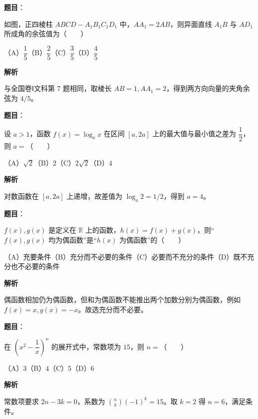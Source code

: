 \begin{answer}

\textbf{题目}：

如图，正四棱柱 $ABCD-A_1B_1C_1D_1$ 中，$AA_1=2AB$，则异面直线 $A_1B$ 与 $AD_1$ 所成角的余弦值为\mbox{（　　）}
\nopagebreak[4]
\begin{center}\end{center}
\nopagebreak[4]
（A）$\dfrac15$\quad（B）$\dfrac25$\quad（C）$\dfrac35$\quad（D）$\dfrac45$

\textbf{解析}

与全国卷Ⅰ文科第 7 题相同，取棱长 $AB=1,AA_1=2$，得到两方向向量的夹角余弦为 $4/5$。


\end{answer}
\begin{answer}

\textbf{题目}：

设 $a>1$，函数 $f(x)=\log_a x$ 在区间 $[a,2a]$ 上的最大值与最小值之差为 $\dfrac12$，则 $a=$\mbox{（　　）}

（A）$\sqrt2$\quad（B）$2$\quad（C）$2\sqrt2$\quad（D）$4$

\textbf{解析}

对数函数在 $[a,2a]$ 上递增，故差值为 $\log_a2=1/2$，得到 $a=4$。


\end{answer}
\begin{answer}

\textbf{题目}：

$f(x),g(x)$ 是定义在 $\mathbb R$ 上的函数，$h(x)=f(x)+g(x)$，则“$f(x),g(x)$ 均为偶函数”是“$h(x)$ 为偶函数”的\mbox{（　　）}

（A）充要条件\quad（B）充分而不必要的条件\quad（C）必要而不充分的条件\quad（D）既不充分也不必要的条件

\textbf{解析}

偶函数相加仍为偶函数，但和为偶函数不能推出两个加数分别为偶函数，例如 $f(x)=x,g(x)=-x$。故选充分而不必要。


\end{answer}
\begin{answer}

\textbf{题目}：

在 $\left(x^2-\dfrac1x\right)^n$ 的展开式中，常数项为 $15$，则 $n=$\mbox{（　　）}

（A）$3$\quad（B）$4$\quad（C）$5$\quad（D）$6$

\textbf{解析}

常数项要求 $2n-3k=0$，系数为 $\binom nk(-1)^k=15$。取 $k=2$ 得 $n=6$，满足条件。


\end{answer}
